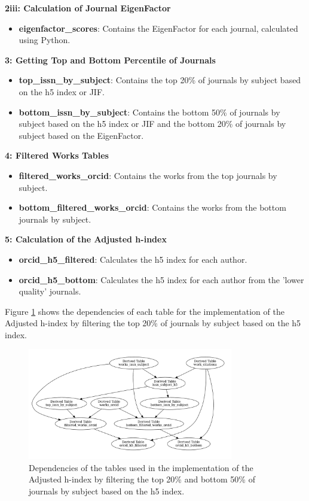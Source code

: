 \noindent\textbf{2iii: Calculation of Journal EigenFactor}
\begin{itemize}
      \item \textbf{eigenfactor\_scores}: Contains the EigenFactor for each journal, calculated using Python.
\end{itemize}

\noindent\textbf{3: Getting Top and Bottom Percentile of Journals}
\begin{itemize}
      \item \textbf{top\_issn\_by\_subject}: Contains the top 20\% of journals by subject based on the h5 index or JIF.
      \item \textbf{bottom\_issn\_by\_subject}: Contains the bottom 50\% of journals by subject based on the h5 index or JIF and the bottom 20\% of journals by subject based on the EigenFactor.
\end{itemize}

\noindent\textbf{4: Filtered Works Tables}
\begin{itemize}
      \item \textbf{filtered\_works\_orcid}: Contains the works from the top journals by subject.
      \item \textbf{bottom\_filtered\_works\_orcid}: Contains the works from the bottom journals by subject.
\end{itemize}

\noindent\textbf{5: Calculation of the Adjusted h-index}
\begin{itemize}
      \item \textbf{orcid\_h5\_filtered}: Calculates the h5 index for each author.
      \item \textbf{orcid\_h5\_bottom}: Calculates the h5 index for each author from the 'lower quality' journals.
\end{itemize}

Figure \ref{fig:tables} shows the dependencies of each table for the
implementation of the Adjusted h-index by filtering the top 20\% of journals by
subject based on the h5 index.

\begin{figure}[H]
      \centering
      \includegraphics[width=0.8\textwidth]{../figs/h5.pdf}
      \caption{Dependencies of the tables used in the implementation of the Adjusted h-index by filtering the top 20\% and bottom 50\% of journals by subject based on the h5 index.}
      \label{fig:tables}
\end{figure}

